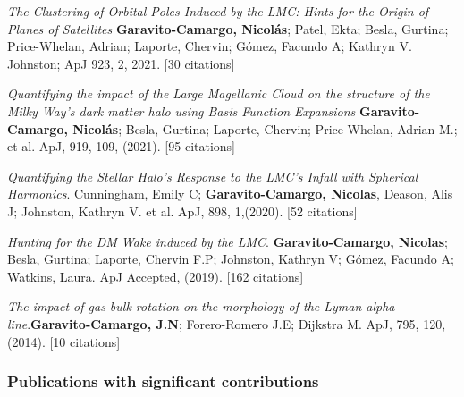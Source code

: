 \documentclass[14pt]{article}
\begin{document}
\begin{etaremune}
\item \textit{The Clustering of Orbital Poles Induced by the LMC: Hints for
      the Origin of Planes of Satellites}
      \textbf{Garavito-Camargo, Nicol\'as}; Patel, Ekta; Besla, Gurtina; Price-Whelan,
      Adrian; Laporte, Chervin; G\'omez, Facundo A; Kathryn V. Johnston; ApJ
      923, 2, 2021. [30 citations]

\item \textit{Quantifying the impact of the Large Magellanic Cloud on the
  structure of the Milky Way’s dark matter halo using Basis Function Expansions} \textbf{Garavito-Camargo, Nicol\'as}; Besla, Gurtina; Laporte,
  Chervin; Price-Whelan, Adrian M.; et al. ApJ, 919, 109, (2021). [95 citations] 

\item \textit{Quantifying the Stellar Halo's Response to the LMC's Infall with
  Spherical Harmonics}. Cunningham, Emily C; \textbf{Garavito-Camargo, Nicolas}, Deason, Alis J;
  Johnston, Kathryn V. et al. ApJ, 898, 1,(2020). [52 citations]


\item \textit{Hunting for the DM Wake induced by the LMC}.
  \textbf{Garavito-Camargo, Nicolas}; Besla, Gurtina; Laporte, Chervin F.P;
  Johnston, Kathryn V; G\'omez, Facundo A; Watkins, Laura. ApJ Accepted, (2019).
  [162 citations]

 \item \textit{The impact of gas bulk rotation on the morphology of the
   Lyman-alpha line}.\textbf{Garavito-Camargo, J.N}; Forero-Romero J.E;
   Dijkstra M. ApJ, 795, 120, (2014). [10 citations]

\end{etaremune}


\subsubsection*{Publications with significant contributions}
\end{document}
